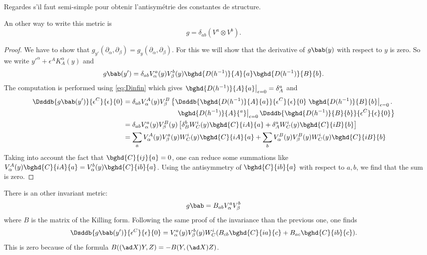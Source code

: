 \begin{probleme}
Regardes s'il faut semi-simple pour obtenir l'antisymétrie des constantes de structure.
\end{probleme}

An other way to write this metric is
\[
  g=\delta_{ab}(V^a\otimes V^b).
\]

\begin{proof}
We have to show that $g_{y'}(\partial_{\alpha},\partial_{\beta})=g_y(\partial_{\alpha},\partial_{\beta})$. For this we will show that the derivative of $g\bab(y)$ with respect to $y$ is zero. So we write ${y'}^{\alpha}+\epsilon^AK_A^{\alpha}(y)$ and
\[
   g\bab(y')=\delta_{ab}V^a_{\alpha}(y)V^b_{\beta}(y)\bghd{D(h^{-1})}{A}{a}\bghd{D(h^{-1})}{B}{b}.
\]
The computation is performed using \eqref{eq:Dinfin} which gives $\left.\bghd{ D(h^{-1}) }{A}{a}\right|_{\epsilon=0}=\delta^a_A$ and
\begin{equation}
\begin{split}
  \Dsddb{  g\bab(y')  }{\epsilon^C}{\epsilon}{0}&=\delta_{ab}V_{\alpha}^A(y)V_{\beta}^B
                                       \left\{
     \Dsddb{  \bghd{D(h^{-1})}{A}{a}  }{\epsilon^C}{\epsilon}{0}\left.\bghd{D(h^{-1})}{B}{b}\right|_{\epsilon=0}.
                                       \right.\\
 &\phantom{ =\delta_{ab}V_{\alpha}^A(y)V_{\beta}^B  }\quad  \left. \left.\bghd{D(h^{-1})}{A}{^a}\right|_{\epsilon=0}\Dsddb{ \bghd{D(h^{-1})}{B}{b} }{\epsilon^C}{\epsilon}{0}\right\}\\
&=\delta_{ab}V^a_{\alpha}(y)V_{\beta}^B(y)\left[  \delta_B^bW^i_C(y)\bghd{C}{iA}{a}+\delta_A^a W^i_C(y)\bghd{C}{iB}{b}  \right]\\
&=\sum_a V^A_{\alpha}(y)V_{\beta}^a(y)W^i_C(y)\bghd{C}{iA}{a}+\sum_b V^B_{\alpha}(y)V_{\beta}^B(y)W^i_C(y)\bghd{C}{iB}{b}
\end{split}
\end{equation}
Taking into account the fact that $\bghd{C}{ij}{a}=0$, one can reduce some summations like $V_{\alpha}^A(y)\bghd{C}{iA}{a}=V_{\alpha}^b(y)\bghd{C}{ib}{a}$. Using the antisymmetry of $\bghd{C}{ib}{a}$ with respect to $a,b$, we find that the sum is zero.

\end{proof}

There is an other invariant metric:
\begin{equation}
   g\bab=B_{ab}V_{\alpha}^aV_{\beta}^b
\end{equation}
where $B$ is the matrix of the Killing form. Following the same proof of the invariance than the previous one, one finds
\[
  \Dsddb{ g\bab(y') }{\epsilon^C}{\epsilon}{0}=V^a_{\alpha}(y)V^b_{\beta}(y)W_C^i( B_{cb}\bghd{C}{ia}{c}+
                               B_{ac}\bghd{C}{ib}{c} ).
\]
This is zero because of the formula $B((\ad X) Y,Z)=-B(Y,(\ad X) Z)$.

